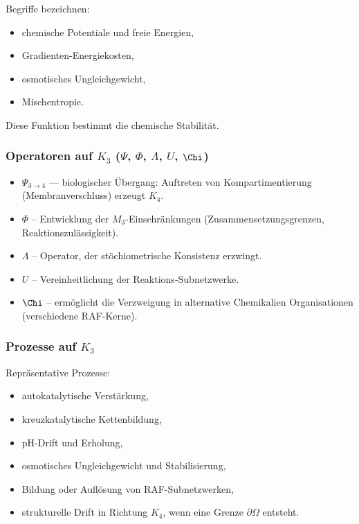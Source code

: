 Begriffe bezeichnen:
\begin{itemize}
    \item chemische Potentiale und freie Energien,
    \item Gradienten-Energiekosten,
    \item osmotisches Ungleichgewicht,
    \item Mischentropie.
\end{itemize}

Diese Funktion bestimmt die chemische Stabilität.

\subsubsection{Operatoren auf \texorpdfstring{$K_3$}{K_3} (\texorpdfstring{$\Psi$}{\Psi}, \texorpdfstring{$\Phi$}{\Phi}, \texorpdfstring{$\Lambda$}{\Lambda}, \texorpdfstring{$U$}{U}, \texorpdfstring{$\Chi$}{\Chi})}

\begin{itemize}
    \item $\Psi_{3\to4}$ — biologischer Übergang: Auftreten von
          Kompartimentierung (Membranverschluss) erzeugt $K_4$.
    \item $\Phi$ – Entwicklung der $M_3$-Einschränkungen (Zusammensetzungsgrenzen,
          Reaktionszulässigkeit).
    \item $\Lambda$ – Operator, der stöchiometrische Konsistenz erzwingt.
    \item $U$ – Vereinheitlichung der Reaktions-Subnetzwerke.
    \item $\Chi$ – ermöglicht die Verzweigung in alternative Chemikalien
          Organisationen (verschiedene RAF-Kerne).
\end{itemize}

\subsubsection{Prozesse auf \texorpdfstring{$K_3$}{K_3}}

Repräsentative Prozesse:
\begin{itemize}
    \item autokatalytische Verstärkung,
    \item kreuzkatalytische Kettenbildung,
    \item pH-Drift und Erholung,
    \item osmotisches Ungleichgewicht und Stabilisierung,
    \item Bildung oder Auflösung von RAF-Subnetzwerken,
    \item strukturelle Drift in Richtung $K_4$, wenn eine Grenze $\partial\Omega$
          entsteht.
\end{itemize}

